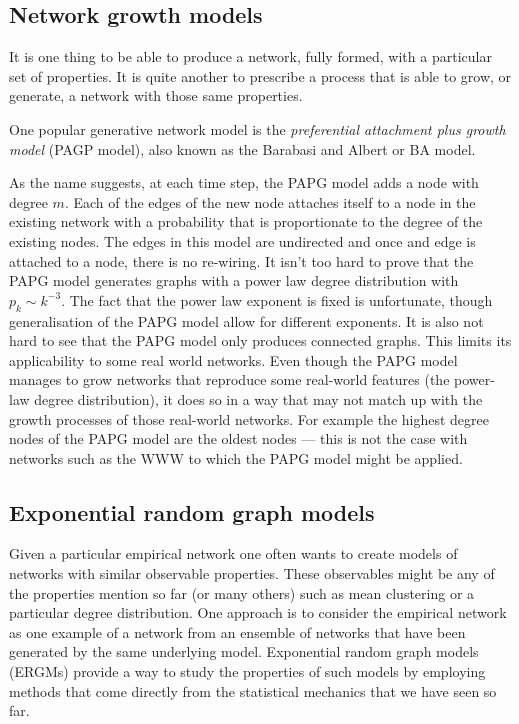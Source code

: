 \subsection{Network growth models}
It is one thing to be able to produce a network, fully formed, with a particular set of properties. It is quite another to prescribe a process that is able to grow, or generate, a network with those same properties.

One popular generative network model is the \emph{preferential attachment plus growth model} (PAGP model), also known as the Barabasi and Albert or BA model.

As the name suggests, at each time step, the PAPG model adds a node with degree $m$. Each of the edges of the new node attaches itself to a node in the existing network with a probability that is proportionate to the degree of the existing nodes. The edges in this model are undirected and once and edge is attached to a node, there is no re-wiring. It isn't too hard to prove that the PAPG model generates graphs with a power law degree distribution with $p_k \sim k^{-3}$. The fact that the power law exponent is fixed is unfortunate, though generalisation of the PAPG model allow for different exponents. It is also not hard to see that the PAPG model only produces connected graphs. This limits its applicability to some real world networks. Even though the PAPG model manages to grow networks that reproduce some real-world features (the power-law degree distribution), it does so in a way that may not match up with the growth processes of those real-world networks. For example the highest degree nodes of the PAPG model are the oldest nodes --- this is not the case with networks such as the WWW to which the PAPG model might be applied.


\subsection{Exponential random graph models}
Given a particular empirical network one often wants to create models of networks with similar observable properties. These observables might be any of the properties mention so far (or many others) such as mean clustering or a particular degree distribution. One approach is to consider the empirical network as one example of a network from an ensemble of networks that have been generated by the same underlying model. Exponential random graph models (ERGMs) provide a way to study the properties of such models by employing methods that come directly from the statistical mechanics that we have seen so far.

